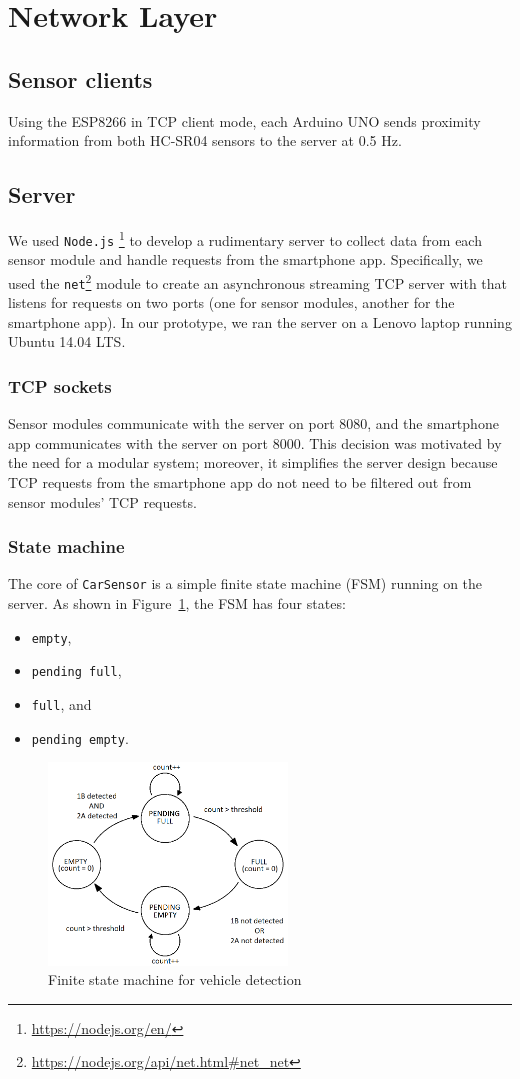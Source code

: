 \documentclass[conference]{IEEEtran}
\begin{document}
\section{Network Layer}
\subsection{Sensor clients}
Using the ESP8266 in TCP client mode, each Arduino UNO sends proximity information from both HC-SR04 sensors to the server at 0.5 Hz.
\subsection{Server}
We used \texttt{Node.js}\textsuperscript{\textregistered} \footnote{\url{https://nodejs.org/en/}} to develop a rudimentary server to collect data from each sensor module and handle requests from the smartphone app. Specifically, we used the \texttt{net}\footnote{\url{https://nodejs.org/api/net.html\#net_net}} module to create an asynchronous streaming TCP server with that listens for requests on two ports (one for sensor modules, another for the smartphone app). In our prototype, we ran the server on a Lenovo laptop running Ubuntu 14.04 LTS.
\subsubsection{TCP sockets}
Sensor modules communicate with the server on port 8080, and the smartphone app communicates with the server on port 8000. This decision was motivated by the need for a modular system; moreover, it simplifies the server design because TCP requests from the smartphone app do not need to be filtered out from sensor modules' TCP requests.
\subsubsection{State machine}
The core of \texttt{CarSensor} is a simple finite state machine (FSM) running on the server. As shown in Figure~\ref{fig_fsm}, the FSM has four states:
\begin{itemize}
\item \texttt{empty},
\item \texttt{pending full},
\item \texttt{full}, and
\item \texttt{pending empty}.
\end{itemize}
\begin{figure}[h]
	\centering
	\includegraphics[width=2.5in]{FSM.png}
	\caption{Finite state machine for vehicle detection}
	\label{fig_fsm}
\end{figure}
\end{document}
